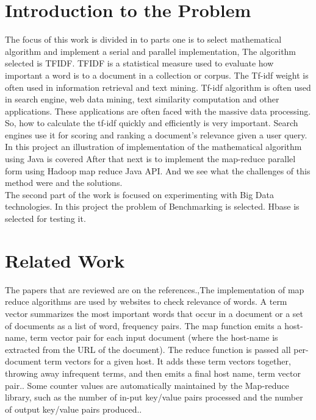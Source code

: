 \documentclass{bigdata}
\begin{document}
\section{Introduction to the Problem}
\noindent
The focus of this work is divided in to parts one is to select mathematical algorithm and implement a serial and parallel implementation, The algorithm selected is TFIDF. TFIDF is a statistical measure used to evaluate how important a word is to a document in a collection or corpus. The Tf-idf weight is often used in information retrieval and text mining.  Tf-idf algorithm is often used in search engine, web data mining, text similarity computation and other applications. These applications are often faced with the massive data processing. So, how to calculate the tf-idf quickly and efficiently is very important. \cite{a} Search engines use it for scoring and ranking a document's relevance given a user query.\\
\noindent
In this project an illustration of implementation of the mathematical algorithm using Java is covered After that next is to implement the map-reduce parallel form using Hadoop map reduce Java API. And we see what the challenges of this method were and the solutions.\\
\noindent
The second part of the work is focused on experimenting with  Big Data technologies. In this project the problem of Benchmarking is selected. Hbase is selected for testing it. \\
\section{Related Work}
The papers that are reviewed are on the references.\cite{a},The implementation of map reduce algorithms are used by websites to check relevance of words. A term vector summarizes the most important words that occur in a document or a set of documents as a list of word, frequency pairs. The map function emits a host-name, term vector pair for each input document (where the host-name is extracted from the URL of the document). The reduce function is passed all per-document term vectors for a given host. It adds these term vectors together, throwing away infrequent terms, and then emits a final host name, term vector pair.\cite{b}. Some counter values are automatically maintained by the Map-reduce library, such as the number of in-put key/value pairs processed and the number of output key/value pairs produced.\cite{b}. \\
\end{document}

